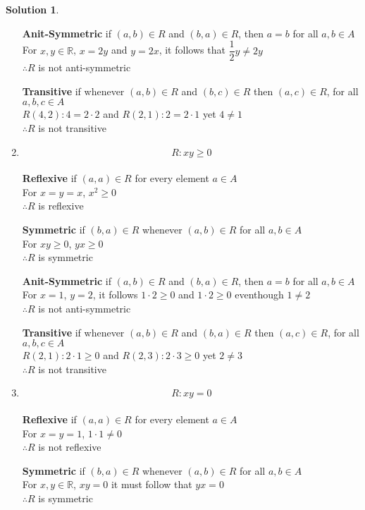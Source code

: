 \documentclass{article}
\theoremstyle{definition}
\newtheorem*{solution}{Solution}
\begin{document}
\begin{solution}
\begin{enumerate}[label=(\alph*)]
      \textbf{Anit-Symmetric} if $(a,b) \in R$ and $(b,a) \in R$, then $a=b$ for all $a,b \in A$ \\
      For $x,y \in \mathbb{R}$, $ x = 2y$ and $ y = 2x$, it follows that $ \dfrac{1}{2} y \neq 2y$\\
      $\therefore R$ is not anti-symmetric 
    
      \textbf{Transitive} if whenever $(a,b) \in R$ and $(b,c) \in R$ then $(a,c) \in R$, for all $a,b,c \in A$ \\
      $R(4,2): 4 = 2 \cdot 2 $ and $R(2,1): 2 = 2 \cdot 1$ yet $ 4 \neq 1$ \\
      $\therefore R$ is not transitive

    \item $$ R: xy \geq 0$$ \\
  
      \textbf{Reflexive} if $(a,a) \in R$ for every element $a \in A$ \\
      For $x = y = x$, $x^2 \geq 0$ \\
      $\therefore R$ is reflexive
    
      \textbf{Symmetric} if $(b,a) \in R$ whenever $(a,b) \in R$ for all $a,b \in A$ \\
      For $xy \geq 0 $, $ yx \geq 0$ \\
      $\therefore R$ is symmetric
    
      \textbf{Anit-Symmetric} if $(a,b) \in R$ and $(b,a) \in R$, then $a=b$ for all $a,b \in A$ \\
      For $x=1$, $y=2$, it follows $1 \cdot 2 \geq 0$ and $1\cdot 2 \geq 0$ eventhough $1 \neq 2$\\
      $\therefore R$ is not anti-symmetric 
    
      \textbf{Transitive} if whenever $(a,b) \in R$ and $(b,a) \in R$ then $(a,c) \in R$, for all $a,b,c \in A$ \\
      $R(2,1): 2 \cdot 1 \geq 0$ and $R(2,3): 2 \cdot 3 \geq 0$ yet $2 \neq 3$ \\
      $\therefore R$ is not transitive

    \item $$ R: xy = 0$$ \\
  
      \textbf{Reflexive} if $(a,a) \in R$ for every element $a \in A$ \\
      For $x = y = 1$, $1 \cdot 1 \neq 0$ \\
      $\therefore R$ is not reflexive
    
      \textbf{Symmetric} if $(b,a) \in R$ whenever $(a,b) \in R$ for all $a,b \in A$ \\
      For $x,y \in \mathbb{R}$, $ xy = 0$ it must follow that $ yx = 0$ \\
      $\therefore R$ is symmetric
    

\end{enumerate}
\end{solution}
\end{document}
